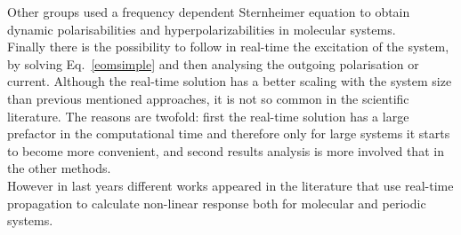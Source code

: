 Other groups used a frequency dependent Sternheimer equation to obtain dynamic polarisabilities and hyperpolarizabilities in molecular systems.\cite{andrade2007time} \\
Finally there is the possibility to follow in real-time the excitation of the system, by solving Eq.~\ref{eomsimple} and then analysing the outgoing polarisation or current. Although the real-time solution has a better scaling  with the system size  than  previous mentioned approaches, it is not so common in the scientific literature. The reasons are twofold: first the real-time solution has a large prefactor in the computational time  and therefore only for large systems it starts to become more convenient, and second results analysis is more involved that in the other methods. \\ 
However in last years different works appeared in the literature that use real-time propagation to calculate non-linear response both for molecular\cite{takimoto:154114,ding2013efficient} and periodic systems.\cite{goncharov2013nonlinear}\\
